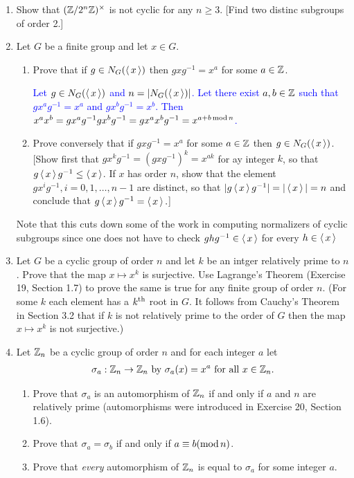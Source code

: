 \documentclass[10pt,a4paper]{report}
\newcommand{\BLUE}[1]{\textcolor{blue}{#1}}
\begin{document}
\begin{enumerate}
	\item Show that $(\mathbb{Z}/2^n\mathbb{Z})^\times$ is not cyclic for any $n \ge 3$.  [Find two distinc subgroups of order 2.]
	
	\item Let $G$ be a finite group and let $ x\in G$.
	\begin{enumerate}
		\item Prove that if $g \in N_G(\left \langle\, x \,\right \rangle)$ then $gxg^{-1}=x^a$ for some $a \in \mathbb{Z}$.
		
		\BLUE{Let $g \in N_G(\left \langle\, x \,\right \rangle)$ and $n = |N_G(\left \langle\, x \,\right \rangle)|$.  Let there exist $a,b \in \mathbb{Z}$ such that $gx^ag^{-1}=x^a$ and $gx^bg^{-1} = x^b$.  Then $x^ax^b=gx^ag^{-1}gx^bg^{-1} = gx^ax^bg^{-1} = x^{a+b\operatorname{mod} n}$.  
		}
		
		\item Prove conversely that if $gxg^{-1}=x^a$ for some $a \in \mathbb{Z}$ then $g \in N_G(\left \langle\, x \,\right \rangle)$. [Show first that $gx^kg^{-1}=(gxg^{-1})^k=x^{ak}$ for ay integer $k$, so that $g\left \langle\, x \,\right \rangle g^{-1}\le \left \langle\, x \,\right \rangle$.  If $x$ has order $n$, show that the element $gx^ig^{-1}, i=0,1,\dots,n-1$ are distinct, so that $|g\left \langle\, x \,\right \rangle g^{-1}|=|\left \langle\, x \,\right \rangle|=n$ and conclude that $g\left \langle\, x \,\right \rangle g^{-1}=\left \langle\, x \,\right \rangle.$]

	\end{enumerate}
	Note that this cuts down some of the work in computing normalizers of cyclic subgroups since one does not have to check $ghg^{-1} \in \left \langle\, x \,\right \rangle$ for every $h \in \left \langle\, x \,\right \rangle$

	\item Let $G$ be a cyclic group of order $n$ and let $k$ be an intger relatively prime to $n$.  Prove that the map $x \mapsto x^k$ is surjective.  Use Lagrange's Theorem (Exercise 19, Section 1.7) to prove the same is true for any finite group of order $n$.  (For some $k$ each element has a $k\textsuperscript{th}$	root in $G$.  It follows from Cauchy's Theorem in Section 3.2 that if $k$ is not relatively prime to the order of $G$ then the map $x \mapsto x^k$ is not surjective.)
	
	\item Let $\mathbb{Z}_n$ be a cyclic group of order $n$ and for each integer $a$ let 
	\begin{align*}
		\sigma_a: \mathbb{Z}_n \to \mathbb{Z}_n \text{ by } \sigma_a(x) = x^a \text{ for all } x \in \mathbb{Z}_n.
	\end{align*}
	\begin{enumerate}
		\item Prove that $\sigma_a$ is an automorphism of $\mathbb{Z}_n$  if and only if $a$ and $n$ are relatively prime (automorphisms were introduced in Exercise 20, Section 1.6).
		\item Prove that $\sigma_a=\sigma_b$ if and only if $a\equiv b(\operatorname{mod} n)$.
		\item Prove that \textit{every} automorphism of $\mathbb{Z}_n$ is equal to $\sigma_a$ for some integer $a$.
		

\end{enumerate}
\end{enumerate}
\end{document}
